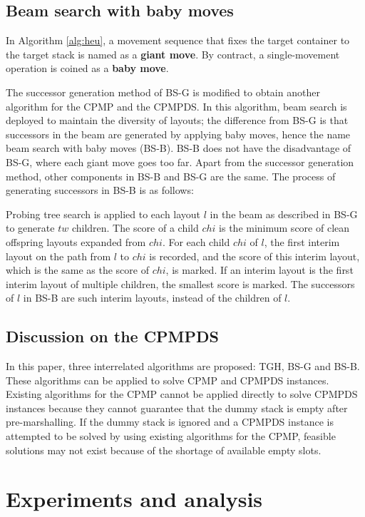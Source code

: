 \documentclass[review,3p,times,authoryear,12pt]{elsarticle}
\begin{document}
\subsection{Beam search with baby moves}

In Algorithm \ref{alg:heu}, a movement sequence that fixes the target container to the target stack is named as a \textbf{giant move}. 
By contract, a single-movement operation is coined as a \textbf{baby move}.

The successor generation method of BS-G is modified to obtain another algorithm for the CPMP and the CPMPDS. 
In this algorithm, beam search is deployed to maintain the diversity of layouts; the difference from BS-G is that successors in the beam are generated by applying baby moves, hence the name beam search with baby moves (BS-B).
BS-B does not have the disadvantage of BS-G, where each giant move goes too far. 
Apart from the successor generation method, other components in BS-B and BS-G are the same. 
The process of generating successors in BS-B is as follows:

Probing tree search is applied to each layout $l$ in the beam as described in BS-G to generate $\mathit{tw}$ children. 
The score of a child $\mathit{chi}$ is the minimum score of clean offspring layouts expanded from $\mathit{chi}$. 
For each child $\mathit{chi}$ of $l$, the first interim layout on the path from $l$ to $\mathit{chi}$ is recorded, and the score of this interim layout, which is the same as the score of $\mathit{chi}$, is marked. 
If an interim layout is the first interim layout of multiple children, the smallest score is marked. 
The successors of $l$ in BS-B are such interim layouts, instead of the children of $l$.

\subsection{Discussion on the CPMPDS}

In this paper, three interrelated algorithms are proposed: TGH, BS-G and BS-B.
These algorithms can be applied to solve CPMP and CPMPDS instances. Existing algorithms for the CPMP cannot be applied directly to solve CPMPDS instances because they cannot guarantee that the dummy stack is empty after pre-marshalling. 
If the dummy stack is ignored and a CPMPDS instance is attempted to be solved by using existing algorithms for the CPMP, feasible solutions may not exist because of the shortage of available empty slots.

\section{Experiments and analysis}
\label{sec:ce}
\end{document}
